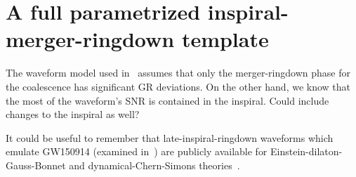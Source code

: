 \documentclass[aps,prd,10pt,preprint,
               notitlepage,onecolumn,superscriptaddress,
               eqsecnum,
               nofootinbib,tightenlines,floatfix]{revtex4-2}
\begin{document}
\section{A full parametrized inspiral-merger-ringdown template}

The waveform model used in~\cite{Brito:2018rfr,Ghosh:2021mrv} assumes that
only the merger-ringdown phase for the coalescence has significant GR deviations.
%
On the other hand, we know that the most of the waveform's SNR is contained in the
inspiral.
%
Could include changes to the inspiral as well?

It could be useful to remember that late-inspiral-ringdown waveforms which emulate
GW150914 (examined in~\cite{Ghosh:2021mrv}) are publicly available for
Einstein-dilaton-Gauss-Bonnet and dynamical-Chern-Simons
theories~\cite{Okounkova:2019zjf,Okounkova:2020rqw}.




\end{document}
